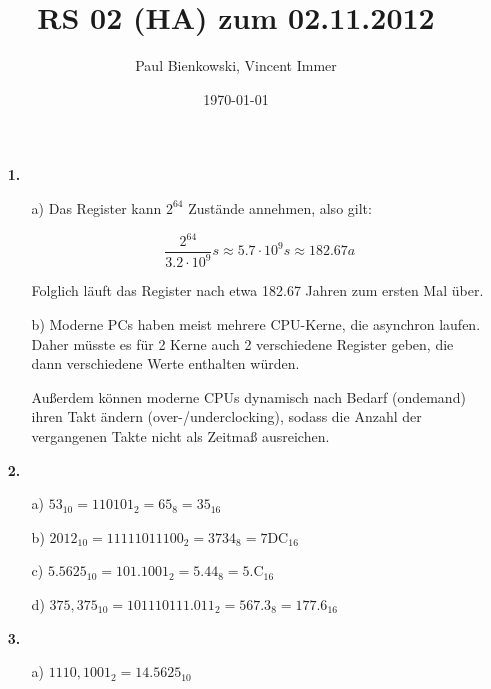 \documentclass[a4paper,10pt]{scrartcl}
\author{Paul Bienkowski, Vincent Immer}
\title{RS 02 (HA) zum 02.11.2012}
\date{\today}
\begin{document}
\setcounter{secnumdepth}{0}
\maketitle

\begin{enumerate}
    \item[\textbf{1.}]
        \begin{enumerate}
            \item[a)]
                Das Register kann $2^{64}$ Zustände annehmen, also gilt:

                $$\frac{2^{64}}{3.2 \cdot 10^9} s \approx 5.7 \cdot 10^9 s \approx 182.67 a$$

                Folglich läuft das Register nach etwa 182.67 Jahren zum ersten Mal über.

            \item[b)]
                Moderne PCs haben meist mehrere CPU-Kerne, die asynchron laufen. Daher müsste es für 2 Kerne auch 2 verschiedene Register
                geben, die dann verschiedene Werte enthalten würden.

                Außerdem können moderne CPUs dynamisch nach Bedarf (ondemand) ihren Takt ändern (over-/underclocking), sodass die Anzahl der
                vergangenen Takte nicht als Zeitmaß ausreichen.
        \end{enumerate}

    \item[\textbf{2.}]
        \begin{enumerate}
            \item[a)]
                $53_{10} = 110101_2 = 65_8 = 35_{16}$

            \item[b)]
                $2012_{10} = 11111011100_2 = 3734_8 = \text{7DC}_{16}$

            \item[c)]
                $5.5625_{10} = 101.1001_2 = 5.44_8 = 5.\text{C}_{16}$

            \item[d)]
                $375,375_{10} = 101110111.011_2 = 567.3_8 = 177.6_{16}$
        \end{enumerate}

    \item[\textbf{3.}]
        \begin{enumerate}
            \item[a)]
                $1110,1001_2 = 14.5625_{10}$


\end{enumerate}
\end{enumerate}
\end{document}
